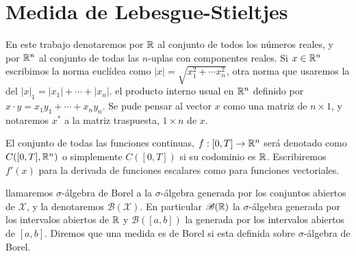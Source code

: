 \chapter{Medida de Lebesgue-Stieltjes}



 \normalmarginpar
En este trabajo denotaremos por $\mathbb{R}$ al conjunto de todos los números reales, y por $\mathbb{R}^n$ al conjunto de todas las $n$-uplas con componentes reales.  Si $x\in \mathbb{R}^n$ escribimos la norma euclídea como $|x|=\sqrt{x_1^2+\cdots x_n^2}$, otra norma  que usaremos  la del  $|x|_1=|x_1|+\cdots +|x_n|$.    el producto interno usual en $\mathbb{R}^n $ definido por  $x\cdot y=x_1y_1 + \cdots+
x_ny_n$. Se pude pensar al vector $x$ como una matriz de $n\times 1$, y notaremos $x^*$ a la matriz traspuesta, $1\times n$ de $x$.

El conjunto de todas las funciones continuas, $f:[0,T]\to \mathbb{R}^n$ será denotado como $C([0,T],\mathbb{R}^n)$ o simplemente $C([0,T])$ si su codominio es $\mathbb{R}$.    Escribiremos $f'(x)$ para la derivada de funciones escalares como para funciones vectoriales. 

 llamaremos $\sigma$-álgebra  de Borel a la $\sigma$-álgebra generada por los conjuntos abiertos de $\mathcal{X}$, y la  denotaremos $\mathscr{B}(\mathcal{X})$. 
En particular $\mathscr{B}(\mathbb{R})$   la $\sigma$-álgebra generada por los intervalos abiertos de $\mathbb{R}$ y $\mathscr{B}([a,b])$ la generada por los intervalos abiertos  de $[a,b]$. Diremos que una medida es de Borel si esta definida sobre $\sigma$-álgebra de Borel.

\reversemarginpar\setlength{\marginparwidth}{2cm}




